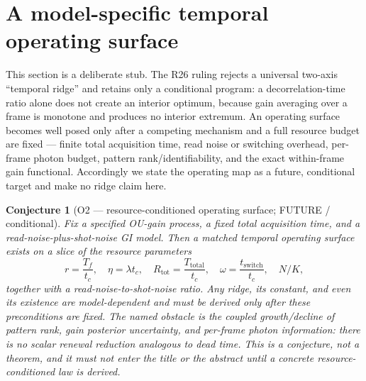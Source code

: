 \documentclass[11pt]{article}
\newtheorem{conjecture}{Conjecture}
\theoremstyle{remark}
\begin{document}
\section{A model-specific temporal operating surface}
\label{sec:o2}
This section is a deliberate stub. The R26 ruling rejects a universal two-axis
``temporal ridge'' and retains only a conditional program: a decorrelation-time
ratio alone does not create an interior optimum, because gain averaging over a
frame is monotone and produces no interior extremum. An operating surface
becomes well posed only after a competing mechanism and a full resource budget
are fixed --- finite total acquisition time, read noise or switching overhead,
per-frame photon budget, pattern rank/identifiability, and the exact
within-frame gain functional. Accordingly we state the operating map as a
future, conditional target and make no ridge claim here.

\begin{conjecture}[O2 --- resource-conditioned operating surface; FUTURE / conditional]
\label{conj:o2}
Fix a specified OU-gain process, a fixed total acquisition time, and a
read-noise-plus-shot-noise GI model. Then a matched temporal operating surface
exists on a slice of the resource parameters
\begin{equation*}
r = \frac{T_f}{t_c},
\quad
\eta = \lambda t_c,
\quad
R_{\mathrm{tot}} = \frac{T_{\mathrm{total}}}{t_c},
\quad
\omega = \frac{t_{\mathrm{switch}}}{t_c},
\quad
N/K,
\end{equation*}
together with a read-noise-to-shot-noise ratio. Any ridge, its constant, and
even its existence are model-dependent and must be derived only after these
preconditions are fixed. The named obstacle is the coupled growth/decline of
pattern rank, gain posterior uncertainty, and per-frame photon information:
there is no scalar renewal reduction analogous to dead time. This is a
conjecture, not a theorem, and it must not enter the title or the abstract until
a concrete resource-conditioned law is derived.
\end{conjecture}

\end{document}
